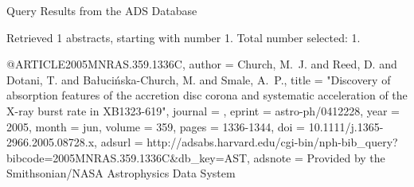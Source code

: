 Query Results from the ADS Database


Retrieved 1 abstracts, starting with number 1.  Total number selected: 1.

@ARTICLE{2005MNRAS.359.1336C,
   author = {{Church}, M.~J. and {Reed}, D. and {Dotani}, T. and {Ba{\l}uci{\'n}ska-Church}, M. and 
	{Smale}, A.~P.},
    title = "{Discovery of absorption features of the accretion disc corona and systematic acceleration of the X-ray burst rate in XB1323-619}",
  journal = {\mnras},
   eprint = {astro-ph/0412228},
     year = 2005,
    month = jun,
   volume = 359,
    pages = {1336-1344},
      doi = {10.1111/j.1365-2966.2005.08728.x},
   adsurl = {http://adsabs.harvard.edu/cgi-bin/nph-bib_query?bibcode=2005MNRAS.359.1336C&db_key=AST},
  adsnote = {Provided by the Smithsonian/NASA Astrophysics Data System}
}


